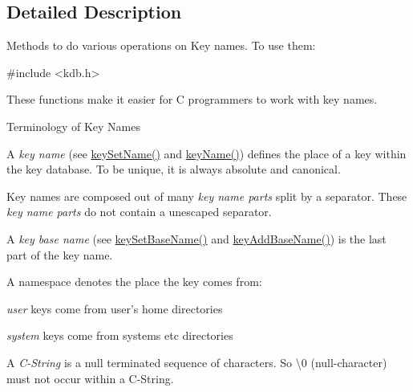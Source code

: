 \subsection{Detailed Description}
Methods to do various operations on Key names. To use them\-: 
\begin{DoxyCode}
\textcolor{preprocessor}{#include <kdb.h>}
\end{DoxyCode}


These functions make it easier for C programmers to work with key names.

\begin{DoxyParagraph}{Terminology of Key Names}

\begin{DoxyItemize}
\item A {\itshape key name} (see \hyperlink{group__keyname_ga7699091610e7f3f43d2949514a4b35d9}{key\-Set\-Name()} and \hyperlink{group__keyname_ga8e805c726a60da921d3736cda7813513}{key\-Name()}) defines the place of a key within the key database. To be unique, it is always absolute and canonical.
\item Key names are composed out of many {\itshape key name parts} split by a separator. These {\itshape key name parts} do not contain a unescaped separator.
\item A {\itshape key base name} (see \hyperlink{group__keyname_ga6e804bd453f98c28b0ff51430d1df407}{key\-Set\-Base\-Name()} and \hyperlink{group__keyname_gaa942091fc4bd5c2699e49ddc50829524}{key\-Add\-Base\-Name()}) is the last part of the key name.
\item A namespace denotes the place the key comes from\-:
\begin{DoxyItemize}
\item {\itshape user} keys come from user's home directories
\item {\itshape system} keys come from systems etc directories
\end{DoxyItemize}
\item A {\itshape C-\/\-String} is a null terminated sequence of characters. So \textbackslash{}0 (null-\/character) must not occur within a C-\/\-String.
\end{DoxyItemize}
\end{DoxyParagraph}

